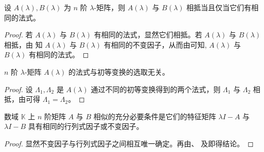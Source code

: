 \documentclass[../../main.tex]{subfiles}%
\begin{document}
\begin{corollary}\label{corollary:相抵当且仅当它们有相同的法式}
设 $A(\lambda), B(\lambda)$ 为 $n$ 阶 $\lambda$-矩阵，则 $A(\lambda)$ 与 $B(\lambda)$ 相抵当且仅当它们有相同的法式。
\end{corollary}
\begin{proof}
若 $A(\lambda)$ 与 $B(\lambda)$ 有相同的法式，显然它们相抵。若 $A(\lambda)$ 与 $B(\lambda)$ 相抵，由 知 $A(\lambda)$ 与 $B(\lambda)$ 有相同的不变因子，从而由可知, $A(\lambda)$ 与 $B(\lambda)$ 有相同的法式。
\end{proof}

\begin{corollary}\label{corollary:矩阵法式与初等变换的选取无关}
$n$ 阶 $\lambda$-矩阵 $A(\lambda)$ 的法式与初等变换的选取无关。
\end{corollary}
\begin{proof}
设 $\varLambda_1, \varLambda_2$ 是 $A(\lambda)$ 通过不同的初等变换得到的两个法式，则 $\varLambda_1$ 与 $\varLambda_2$ 相抵，由可得 $\varLambda_1 = \varLambda_2$。
\end{proof}

\begin{theorem}\label{theorem:矩阵相似关于不变因子和行列式因子的充要条件}
数域 $\mathbb{K}$ 上 $n$ 阶矩阵 $A$ 与 $B$ 相似的充分必要条件是它们的特征矩阵 $\lambda I - A$ 与 $\lambda I - B$ 具有相同的行列式因子或不变因子。
\end{theorem}
\begin{proof}
显然不变因子与行列式因子之间相互唯一确定。再由、 及即得结论。
\end{proof}
\end{document}
